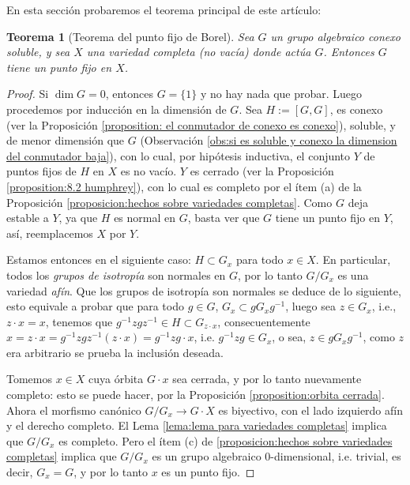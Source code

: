 \documentclass[spanish,12pt]{amsart}
\newtheorem{theorem}{Teorema}[section]
\theoremstyle{definition}
\theoremstyle{remark}
\numberwithin{equation}{section}
\begin{document}
En esta sección probaremos el teorema principal de este artículo:

\begin{theorem}[Teorema del punto fijo de Borel]\label{teorema:punto fijo de borel}
Sea $G$ un grupo algebraico conexo soluble, y sea $X$ una variedad completa (no vacía) donde actúa $G$. Entonces $G$ tiene un punto fijo en $X$.
\end{theorem}
\begin{proof}
Si $\dim G = 0$, entonces $G = \{1\}$ y no hay nada que probar. Luego procedemos por inducción en la dimensión de $G$. Sea $H := [G, G]$, es conexo (ver la Proposición \ref{proposition: el conmutador de conexo es conexo}), soluble, y de menor dimensión que $G$ (Observación \ref{obs:si es soluble y conexo la dimension del conmutador baja}), con lo cual, por hipótesis inductiva, el conjunto $Y$ de puntos fijos de $H$ en $X$ es no vacío. $Y$ es cerrado (ver la Proposición \ref{proposition:8.2 humphrey}), con lo cual es completo por el ítem (a) de la Proposición \ref{proposicion:hechos sobre variedades completas}. Como $G$ deja estable a $Y$, ya que $H$ es normal en $G$, basta ver que $G$ tiene un punto fijo en $Y$, así, reemplacemos $X$ por $Y$.

Estamos entonces en el siguiente caso: $H \subset G_x$ para todo $x \in X$. En particular, todos los \textit{grupos de isotropía} son normales en $G$, por lo tanto $G/G_x$ es una variedad \textit{afín}. Que los grupos de isotropía son normales se deduce de lo siguiente, esto equivale a probar que para todo $g \in G$, $G_x \subset g G_x g^{-1}$, luego sea $z \in G_x$, i.e., $z \cdot x = x$, tenemos que $g^{-1}z g z^{-1} \in H \subset G_{z \cdot x}$, consecuentemente $x = z \cdot x = g^{-1} z g z^{-1} (z \cdot x) = g^{-1} z g \cdot x$, i.e. $g ^{-1} z g \in G_x$, o sea, $z \in g G_x g^{-1}$, como $z$ era arbitrario se prueba la inclusión deseada.

Tomemos $x \in X$ cuya órbita $G \cdot x$ sea cerrada, y por lo tanto nuevamente completo: esto se puede hacer, por la Proposición \ref{proposition:orbita cerrada}. Ahora el morfismo canónico $G / G_x \to G \cdot X$ es biyectivo, con el lado izquierdo afín y el derecho completo. El Lema \ref{lema:lema para variedades completas} implica que $G/G_x$ es completo. Pero el ítem (c) de \ref{proposicion:hechos sobre variedades completas} implica que $G/G_x$ es un grupo algebraico $0$-dimensional, i.e. trivial, es decir, $G_x = G$, y por lo tanto $x$ es un punto fijo.
\end{proof}
\end{document}
